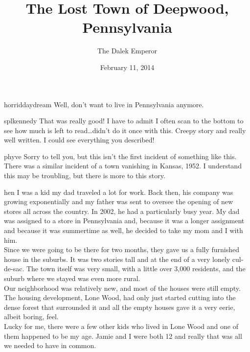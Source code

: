\documentclass[a5paper]{scrartcl}
\title{The Lost Town of Deepwood, Pennsylvania}
\author{The Dalek Emperor}
\date{February 11, 2014}
\begin{document}
\maketitle

\begin{shadequote}[l]{horriddaydream}
Well, don't want to live in Pennsylvania anymore.
\end{shadequote}

\begin{shadequote}[l]{splkennedy}
That was really good! I have to admit I often scan to the bottom to see how much is left to read\dots didn't do it once with this. Creepy story and really well written. I could see everything you described!
\end{shadequote}

\begin{shadequote}[l]{phyve}
Sorry to tell you, but this isn't the first incident of something like this. There was a similar incident of a town vanishing in Kansas, 1952. I understand this may be troubling, but there is more to this story.
\end{shadequote}

hen I was a kid my dad traveled a lot for work. Back then, his company was growing exponentially and my father was sent to oversee the opening of new stores all across the country. In 2002, he had a particularly busy year. My dad was assigned to a store in Pennsylvania and, because it was a longer assignment and because it was summertime as well, he decided to take my mom and I with him. \\


Since we were going to be there for two months, they gave us a fully furnished house in the suburbs. It was two stories tall and at the end of a very lonely cul-de-sac. The town itself was very small, with a little over 3,000 residents, and the suburb where we stayed was even more rural.  \\


Our neighborhood was relatively new, and most of the houses were still empty. The housing development, Lone Wood, had only just started cutting into the dense forest that surrounded it and all the empty houses gave it a very eerie, albeit boring, feel. \\


Lucky for me, there were a few other kids who lived in Lone Wood and one of them happened to be my age. Jamie and I were both 12 and really that was all we needed to have in common. \\
\end{document}
